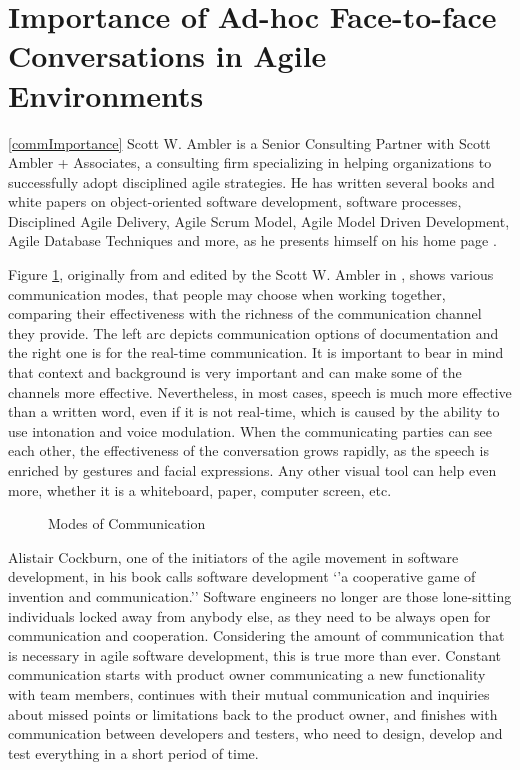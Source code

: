 \documentclass[11pt,singleside]{myfithesis2}
\newcommand{\pict}[4]{
	\begin{figure}[h!]
  		\vspace{-7px}
  		\centerline{\fcolorbox{darkgray}{palegray}{\texttt{[image: \#2]}}}
  		\caption{#1}
  		\label{#4}
	\end{figure}
}
\begin{document}
	\section{Importance of Ad-hoc Face-to-face Conversations in Agile Environments}\ref{commImportance}
Scott W. Ambler is a Senior Consulting Partner with Scott Ambler + Associates, a consulting firm specializing in helping organizations to successfully adopt disciplined agile strategies. He has written several books and white papers on object-oriented software development, software processes, Disciplined Agile Delivery, Agile Scrum Model, Agile Model Driven Development, Agile Database Techniques and more, as he presents himself on his home page \cite{ambler}.

Figure \ref{pic:commModes}, originally from \cite{agileCockburn} and edited by the Scott W. Ambler in \cite{roninInt}, shows various communication modes, that people may choose when working together, comparing their effectiveness with the richness of the communication channel they provide. The left arc depicts communication options of documentation and the right one is for the real-time communication. It is important to bear in mind that context and background is very important and can make some of the channels more effective. Nevertheless, in most cases, speech is much more effective than a written word, even if it is not real-time, which is caused by the ability to use intonation and voice modulation. When the communicating parties can see each other, the effectiveness of the conversation grows rapidly, as the speech is enriched by gestures and facial expressions. Any other visual tool can help even more, whether it is a whiteboard, paper, computer screen, etc.

\pict{Modes of Communication \cite{roninInt}}{data/communicationModes.png}{width=0.8\textwidth}{pic:commModes}

Alistair Cockburn, one of the initiators of the agile movement in software development, in his book \cite{commCockburn} calls software development `'a cooperative game of invention and communication.'' Software engineers no longer are those lone-sitting individuals locked away from anybody else, as they need to be always open for communication and cooperation. Considering the amount of communication that is necessary in agile software development, this is true more than ever. Constant communication starts with product owner communicating a new functionality with team members, continues with their mutual communication and inquiries about missed points or limitations back to the product owner, and finishes with communication between developers and testers, who need to design, develop and test everything in a short period of time. 
\end{document}
